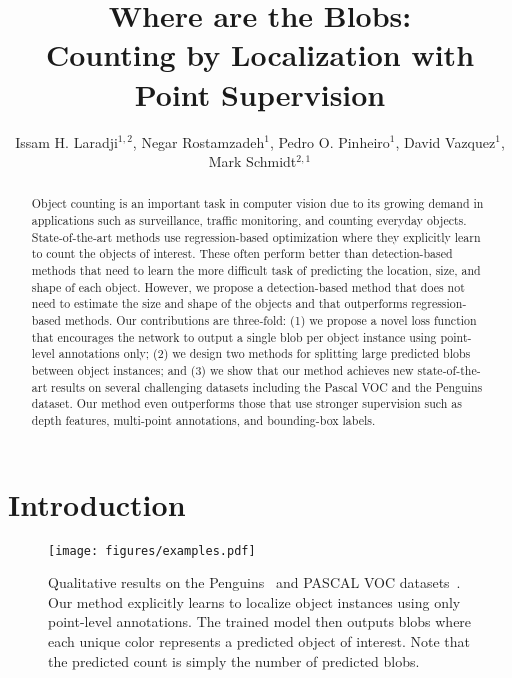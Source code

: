 \documentclass[runningheads]{llncs}
\begin{document}
\pagestyle{headings}
\mainmatter

\title{Where are the Blobs:\\ Counting by Localization with Point Supervision}

\author{Issam H. Laradji$^{1,2}$, Negar Rostamzadeh$^{1}$, Pedro O. Pinheiro$^{1}$, David Vazquez$^{1}$, Mark Schmidt$^{2,1}$}

\maketitle

\begin{abstract}
Object counting is an important task in computer vision due to its growing demand in applications such as surveillance, traffic monitoring, and counting everyday objects. State-of-the-art methods use regression-based optimization where they explicitly learn to count the objects of interest. These often perform better than detection-based methods that need to learn the more difficult task of predicting the location, size, and shape of each object. However, we propose a detection-based method that does not need to estimate the size and shape of the objects and that outperforms regression-based methods. Our contributions are three-fold: (1) we propose a novel loss function that encourages the network to output a single blob per object instance using point-level annotations only; (2) we design two methods for splitting large predicted blobs between object instances; and (3) we show that our method achieves new state-of-the-art results on several challenging datasets including the Pascal VOC and the Penguins dataset. Our method even outperforms those that use stronger supervision such as depth features, multi-point annotations, and bounding-box labels. 



\end{abstract}

\section{Introduction}
\label{sec:introduction}
\begin{figure}[t]
\centering
\texttt{[image: figures/examples.pdf]}
\caption{Qualitative results on the Penguins~\cite{arteta2016counting} and PASCAL VOC datasets~\cite{everingham2015pascal}. Our method explicitly learns to localize object instances using only point-level annotations. The trained model then outputs blobs where each unique color represents a predicted object of interest. Note that the predicted count is simply the number of predicted blobs.}
\label{fig:res-qualitative}
\end{figure}
\end{document}
